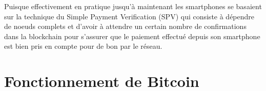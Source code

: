 \documentclass[12pt,a4paper]{article}
\begin{document}
	Puisque effectivement en pratique jusqu'à maintenant les smartphones se basaient sur la technique du Simple Payment Verification (SPV) qui consiste à dépendre de noeuds complets et d'avoir à attendre un certain nombre de confirmations dans la blockchain pour s'assurer que le paiement effectué depuis son smartphone est bien pris en compte pour de bon par le réseau.\\
	
	
	
	\newpage
	
	\section{Fonctionnement de Bitcoin} %
	
\end{document}
